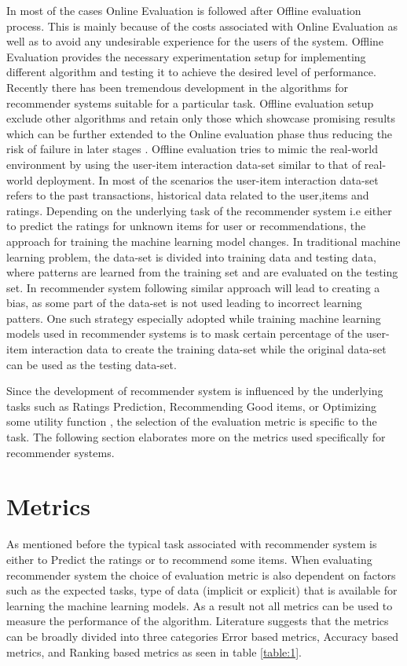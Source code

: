 \begin{itemize}
	In most of the cases Online Evaluation is followed after Offline evaluation process. This is mainly because of the costs associated with Online Evaluation as well as to avoid any undesirable experience for the users of the system. Offline Evaluation provides the necessary experimentation setup for implementing different algorithm and testing it to achieve the desired level of performance. Recently there has been tremendous development in the algorithms for recommender systems suitable for a particular task. Offline evaluation setup exclude other algorithms and retain only those which showcase promising results which can be further extended to the Online evaluation phase thus reducing the risk of failure in later stages \autocite[2941]{gunawardana2009survey}. Offline evaluation tries to mimic the real-world environment by using the user-item interaction data-set similar to that of real-world deployment. In most of the scenarios the user-item interaction data-set refers to the past transactions, historical data related to the user,items and ratings. Depending on the underlying task of the recommender system i.e either to predict the ratings for unknown items for user or recommendations, the approach for training the machine learning model changes. In traditional machine learning problem, the data-set is divided into training data and testing data, where patterns are learned from the training set and are evaluated on the testing set. In recommender system following similar approach will lead to creating a bias, as some part of the data-set is not used leading to incorrect learning patters. One such strategy especially adopted while training machine learning models used in recommender systems is to mask certain percentage of the user-item interaction data to create the training data-set while the original data-set can be used as the testing data-set.
	
\end{itemize}


Since the development of recommender system is influenced by the underlying tasks such as Ratings Prediction, Recommending Good items, or Optimizing some utility function \autocite[2938]{gunawardana2009survey}, the selection of the evaluation metric is specific to the task. The following section elaborates more on the metrics used specifically for recommender systems.

\section{Metrics}
As mentioned before the typical task associated with recommender system is either to Predict the ratings or to recommend some items. When evaluating recommender system the choice of evaluation metric is also dependent on factors such as the expected tasks, type of data (implicit or explicit) that is available for learning the machine learning models. As a result not all metrics can be used to measure the performance of the algorithm. Literature suggests that the metrics can be broadly divided into three categories Error based metrics, Accuracy based metrics, and Ranking based metrics as seen in table \ref{table:1}.  \\

